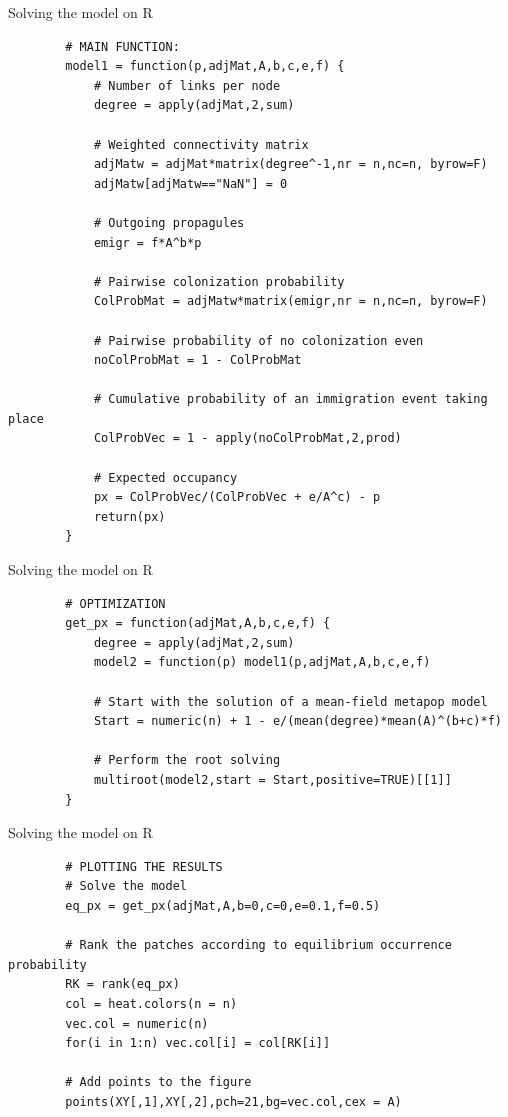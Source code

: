 \documentclass{eecslides}
\begin{document}

	\begin{frame}[fragile]{Solving the model on R}
		\begin{lstlisting}
		# MAIN FUNCTION: 
		model1 = function(p,adjMat,A,b,c,e,f) {
			# Number of links per node
			degree = apply(adjMat,2,sum)

			# Weighted connectivity matrix
			adjMatw = adjMat*matrix(degree^-1,nr = n,nc=n, byrow=F) 
			adjMatw[adjMatw=="NaN"] = 0

			# Outgoing propagules
			emigr = f*A^b*p 

			# Pairwise colonization probability
			ColProbMat = adjMatw*matrix(emigr,nr = n,nc=n, byrow=F) 

			# Pairwise probability of no colonization even
			noColProbMat = 1 - ColProbMat	

			# Cumulative probability of an immigration event taking place
			ColProbVec = 1 - apply(noColProbMat,2,prod) 

			# Expected occupancy
			px = ColProbVec/(ColProbVec + e/A^c) - p
			return(px)
		}
		\end{lstlisting}
	\end{frame}
	

	\begin{frame}[fragile]{Solving the model on R}
		\begin{lstlisting}
		# OPTIMIZATION
		get_px = function(adjMat,A,b,c,e,f) {
			degree = apply(adjMat,2,sum)
			model2 = function(p) model1(p,adjMat,A,b,c,e,f)
			
			# Start with the solution of a mean-field metapop model
			Start = numeric(n) + 1 - e/(mean(degree)*mean(A)^(b+c)*f) 

			# Perform the root solving
			multiroot(model2,start = Start,positive=TRUE)[[1]]
		}
		\end{lstlisting}
	\end{frame}
	

	\begin{frame}[fragile]{Solving the model on R}
		\begin{lstlisting}
		# PLOTTING THE RESULTS
		# Solve the model
		eq_px = get_px(adjMat,A,b=0,c=0,e=0.1,f=0.5)

		# Rank the patches according to equilibrium occurrence probability
		RK = rank(eq_px)
		col = heat.colors(n = n)
		vec.col = numeric(n)
		for(i in 1:n) vec.col[i] = col[RK[i]]

		# Add points to the figure
		points(XY[,1],XY[,2],pch=21,bg=vec.col,cex = A)
		\end{lstlisting}
	\end{frame}
	
\end{document}
